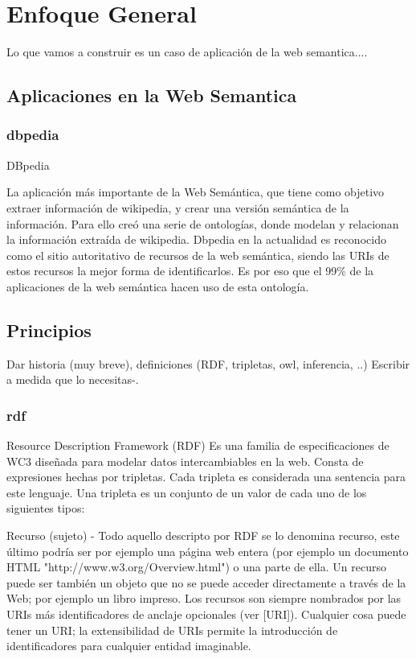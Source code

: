 \chapter{Enfoque General}
\label{chapter:estrategia}

Lo que vamos a construir es un caso de aplicación de la web semantica....

\section{Aplicaciones en la Web Semantica}

\subsection{dbpedia}

DBpedia

La aplicación más importante de la Web Semántica, que tiene como objetivo extraer información de wikipedia, y crear una versión semántica 
de la información. Para ello creó una serie de ontologías, donde modelan y relacionan la información extraída de wikipedia.
Dbpedia en la actualidad es reconocido como el sitio autoritativo de recursos de la web semántica, siendo las URIs de estos recursos 
la mejor forma de identificarlos.
Es por eso que el 99\% de la aplicaciones de la web semántica hacen uso de esta ontología.

\section{Principios}
Dar historia (muy breve), definiciones  (RDF, tripletas, owl, inferencia, ..)
Escribir a medida que lo necesitas-.

\subsection{rdf}
Resource Description Framework (RDF)
Es una familia de especificaciones de WC3 diseñada para modelar datos intercambiables en la web. 
Consta de expresiones hechas por tripletas. Cada tripleta es considerada una sentencia para este lenguaje.
Una tripleta es un conjunto de un valor de cada uno de los siguientes tipos:

Recurso (sujeto) - Todo aquello descripto por RDF se lo denomina recurso, este último podría ser por ejemplo una página web entera (por ejemplo 
un documento HTML "http://www.w3.org/Overview.html") o una parte de ella.  Un recurso puede ser también un objeto que no 
se puede acceder directamente a través de la Web; por ejemplo un libro impreso. Los recursos son siempre nombrados por las 
URIs más identificadores de anclaje opcionales (ver [URI]). Cualquier cosa puede tener un URI; la extensibilidad de URIs 
permite la introducción de identificadores para cualquier entidad imaginable.

